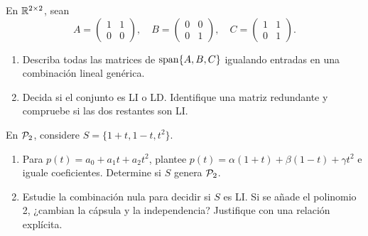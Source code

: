\documentclass[compacto,10pt]{pubciencias-notas}
\begin{document}
\begin{ejer}
    En $\Mat[\R]{2}{2}$, sean
    \[
        A=\begin{pmatrix}1&1\\0&0\end{pmatrix},\quad
        B=\begin{pmatrix}0&0\\0&1\end{pmatrix},\quad
        C=\begin{pmatrix}1&1\\0&1\end{pmatrix}.
    \]
    \begin{enumerate}
        \item Describa todas las matrices de $\spn\{A,B,C\}$ igualando
              entradas en una combinación lineal genérica.
        \item Decida si el conjunto es LI o LD. Identifique una matriz
              redundante y compruebe si las dos restantes son LI.
    \end{enumerate}
\end{ejer}

\begin{ejer}
    En $\Pol_2$, considere $S=\{1+t,1-t,t^2\}$.
    \begin{enumerate}
        \item Para $p(t)=a_0+a_1t+a_2t^2$, plantee
              $p(t)=\alpha(1+t)+\beta(1-t)+\gamma t^2$ e iguale
              coeficientes. Determine si $S$ genera $\Pol_2$.
        \item Estudie la combinación nula para decidir si $S$ es LI.
              Si se añade el polinomio 2, ¿cambian la cápsula y la
              independencia? Justifique con una relación explícita.
    \end{enumerate}
\end{ejer}
\end{document}
